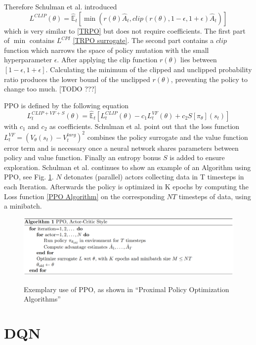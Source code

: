 Therefore Schulman et al. introduced
\begin{equation}\label{PPO}
    L^{CLIP}(\theta) = \hat{\mathbb{E}}_{t}[\min(r(\theta)\hat{A}_{t},clip(r(\theta), 1-\epsilon, 1+\epsilon)\hat{A}_{t})]
\end{equation}
which is very similar to \eqref{TRPO} but does not require coefficients.
The first part of $\min$ contains $L^{CPI}$ \eqref{TRPO surrogate}.
The second part contains a $clip$ function which narrows the space of policy mutation with
the small hyperparameter $\epsilon$. After applying the clip function $r(\theta)$ lies between
$[1-\epsilon,1+\epsilon]$. Calculating the minimum of the clipped and unclipped probability ratio
produces the lower bound of the unclipped $r(\theta)$, preventing the policy to change too much.
    [TODO ???]

PPO is defined by the following equation
\begin{equation}\label{PPO Algorithm}
    L_{t}^{CLIP+VF+S}(\theta) = \hat{\mathbb{E}}_{t}[L_{t}^{CLIP}(\theta) - c_{1}L_{t}^{VF}(\theta) + c_{2}S[\pi_{\theta}](s_{t})]
\end{equation}
with $c_{1}$ and $c_{2}$ as coefficients. Schulman et al. point out that the loss function
$L_{t}^{VF} = (V_{\theta}(s_{t})-V_{t}^{targ})^2$
combines the policy surrogate and the value function error term and is
necessary once a neural network shares parameters between policy and value function.
Finally an entropy bonus $S$ is added to ensure exploration.
Schulman et al. continues to show an example of an Algorithm using PPO, see Fig. \ref{fig:ppo_algo_code}.
$N$ detonates (parallel) actors collecting data in T timesteps in each Iteration.
Afterwards the policy is optimized in K epochs by computing the Loss function \eqref{PPO Algorithm} on the
corresponding $NT$ timesteps of data, using a minibatch.
\begin{figure}[hpbt]
    \centering
    \includegraphics[width=1\textwidth]{pictures/ppo_algo_code.png}\\
    \caption[Exemplary use of PPO]{Exemplary use of PPO, as shown in ``Proximal Policy Optimization Algorithms''\cite{scwo2017}}\label{fig:ppo_algo_code}
\end{figure}

\section{DQN}